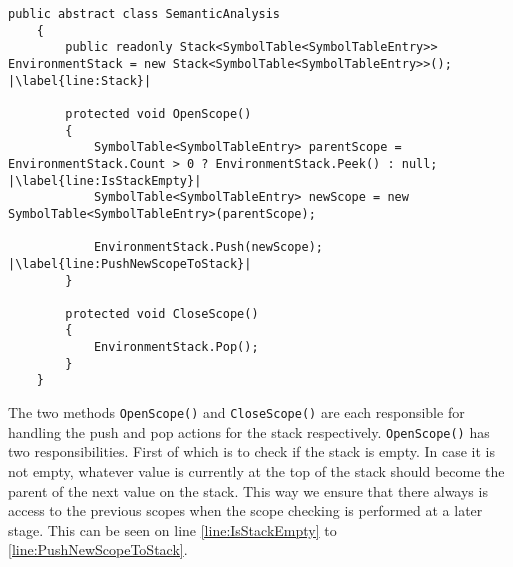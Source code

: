 \begin{lstlisting}[caption={Abstract class SemanticAnalysis}, label={lst:ACSemanticAnalysis},escapechar=|]
    public abstract class SemanticAnalysis
    {
        public readonly Stack<SymbolTable<SymbolTableEntry>> EnvironmentStack = new Stack<SymbolTable<SymbolTableEntry>>(); |\label{line:Stack}|

        protected void OpenScope()
        {
            SymbolTable<SymbolTableEntry> parentScope = EnvironmentStack.Count > 0 ? EnvironmentStack.Peek() : null; |\label{line:IsStackEmpty}|
            SymbolTable<SymbolTableEntry> newScope = new SymbolTable<SymbolTableEntry>(parentScope);
            
            EnvironmentStack.Push(newScope); |\label{line:PushNewScopeToStack}|
        }

        protected void CloseScope()
        {
            EnvironmentStack.Pop();
        }
    }
\end{lstlisting}

The two methods \texttt{OpenScope()} and \texttt{CloseScope()} are each responsible for handling the push and pop actions for the stack respectively.
\texttt{OpenScope()} has two responsibilities. First of which is to check if the stack is empty. In case it is not empty, whatever value is currently at the top of the stack should become the parent of the next value on the stack. This way we ensure that there always is access to the previous scopes when the scope checking is performed at a later stage. This can be seen on line \ref{line:IsStackEmpty} to \ref{line:PushNewScopeToStack}.